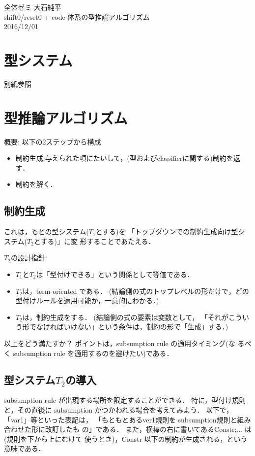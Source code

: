 \documentclass[dvipdfmx]{jsarticle}
\begin{document}
\begin{center}
  全体ゼミ 大石純平 \\
  shift0/reset0 + code 体系の型推論アルゴリズム \\
  2016/12/01
\end{center}

\section{型システム}

別紙参照

\section{型推論アルゴリズム}

概要: 以下の2ステップから構成
\begin{itemize}
\item 制約生成:与えられた項にたいして，(型およびclassifierに関する)制約を返す．
\item 制約を解く．
\end{itemize}

\subsection{制約生成}

これは，もとの型システム($T_1$とする)を
「トップダウンでの制約生成向け型システム($T_2$とする)」に変
形することであたえる．

$T_2$の設計指針:
\begin{itemize}
\item $T_1$と$T_2$は「型付けできる」という関係として等価である．
\item $T_2$は，term-oriented である．
  (結論側の式のトップレベルの形だけで，どの型付けルールを適用可能か，一意的にわかる．)
\item $T_2$は，制約生成をする．
  (結論側の式の要素は変数として，
  「それがこういう形でなければいけない」という条件は，制約の形で「生成」する．)
\end{itemize}

以上をどう満たすか？ ポイントは，subsumption rule の適用タイミング(な
るべく subsumption rule を適用するのを避けたい)である．

\subsection{型システム$T_2$の導入}

subsumption rule が出現する場所を限定することができる．
特に，型付け規則と，その直後に subsumption がつかわれる場合を考えてみよう．
以下で，「var1」等といった表記は，
「もともとあるver1規則を subsumption規則と組み合わせた形に改訂したも
の」である．
また，横棒の右に書いてあるConstr;... は(規則を下から上にむけて
使うとき)，Constr 以下の制約が生成される，という意味である．
\end{document}
